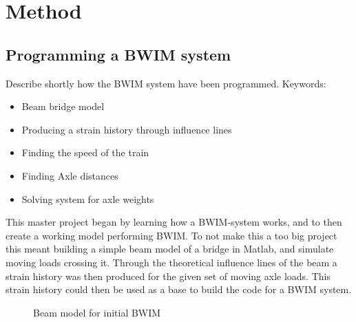 \section{Method}

\subsection{Programming a BWIM system}
Describe shortly how the BWIM system have been programmed.
Keywords: 
\begin{itemize}
\item Beam bridge model
\item Producing a strain history through influence lines
\item Finding the speed of the train
\item Finding Axle distances
\item Solving system for axle weights
\end{itemize}

This master project began by learning how a BWIM-system works, and to then create a working model performing BWIM. To not make this a too big project this meant building a simple beam model of a bridge in Matlab, and simulate moving loads crossing it. Through the theoretical influence lines of the beam a strain history was then produced for the given set of moving axle loads. This strain history could then be used as a base to build the code for a BWIM system. 
\\
\begin{figure}
\caption{Beam model for initial BWIM}
\end{figure}
